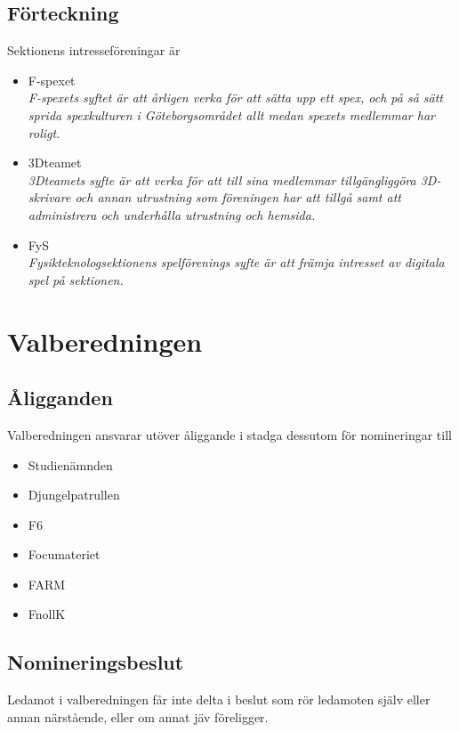 \documentclass{styrdokument}
\begin{document}
\subsection{Förteckning}
\? Sektionens intresseföreningar är
\begin{itemize}
    \item F-spexet \\
        {\itshape F-spexets syftet är att årligen verka för att sätta upp ett spex, och på så sätt sprida spexkulturen i Göteborgsområdet allt medan spexets medlemmar har roligt.}
    \item 3Dteamet \\
        {\itshape 3Dteamets syfte är att verka för att till sina medlemmar tillgängliggöra 3D-skrivare och annan utrustning som föreningen har att tillgå samt att administrera och underhålla utrustning och hemsida.}
    \item FyS \\
        {\itshape Fysikteknologsektionens spelförenings syfte är att främja intresset av digitala spel på sektionen.}
\end{itemize}

\section{Valberedningen}

\subsection{Åligganden}
\? Valberedningen ansvarar utöver åliggande i stadga dessutom för nomineringar till
\begin{itemize}
    \item Studienämnden
    \item Djungelpatrullen
    \item F6
    \item Focumateriet
    \item FARM
    \item FnollK
\end{itemize}

\subsection{Nomineringsbeslut}
\? Ledamot i valberedningen får inte delta i beslut som rör ledamoten själv eller annan närstående, eller om annat jäv föreligger.
\end{document}
